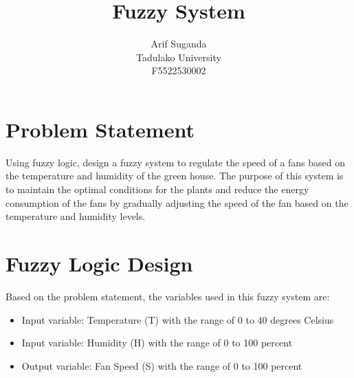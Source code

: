 \documentclass[12pt,a4paper]{article}
\title{Fuzzy System}
\author{Arif Suganda\\
        Tadulako University\\
        F5522530002}
\begin{document}
\maketitle
\section{Problem Statement}
Using fuzzy logic, design a fuzzy system to regulate the speed of a fans based on the temperature and humidity of the green house.
The purpose of this system is to maintain the optimal conditions for the plants and reduce the energy consumption of the fans by gradually adjusting the speed of the fan based on the temperature and humidity levels.

\section{Fuzzy Logic Design}
Based on the problem statement, the variables used in this fuzzy system are:
\begin{itemize}
    \item Input variable: Temperature (T) with the range of 0 to 40 degrees Celsius
    \item Input variable: Humidity (H) with the range of 0 to 100 percent
    \item Output variable: Fan Speed (S) with the range of 0 to 100 percent
\end{itemize}
\end{document}
